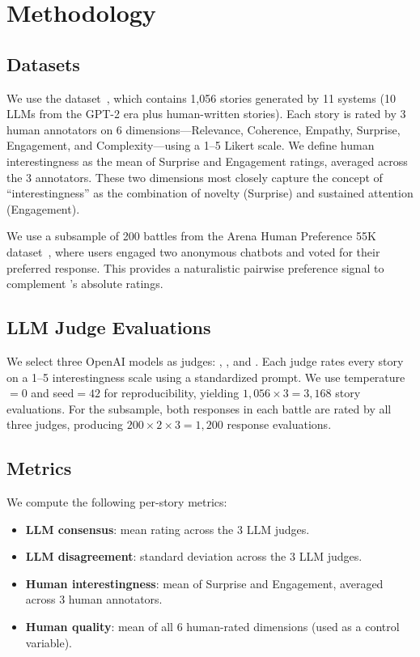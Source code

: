 \section{Methodology}
\label{sec:method}

\subsection{Datasets}
\label{sec:datasets}

We use the \hanna dataset~\citep{chhun2022hanna}, which contains 1,056 stories generated by 11 systems (10 LLMs from the GPT-2 era plus human-written stories).
Each story is rated by 3 human annotators on 6 dimensions---Relevance, Coherence, Empathy, Surprise, Engagement, and Complexity---using a 1--5 Likert scale.
We define human interestingness as the mean of Surprise and Engagement ratings, averaged across the 3 annotators.
These two dimensions most closely capture the concept of ``interestingness'' as the combination of novelty (Surprise) and sustained attention (Engagement).

We use a subsample of 200 battles from the Arena Human Preference 55K dataset~\citep{lmsys2023arena}, where users engaged two anonymous chatbots and voted for their preferred response.
This provides a naturalistic pairwise preference signal to complement \hanna's absolute ratings.

\subsection{LLM Judge Evaluations}
\label{sec:judges}

We select three OpenAI models as judges: \gptfo, \gptfomini, and \gptfourmini.
Each judge rates every \hanna story on a 1--5 interestingness scale using a standardized prompt.
We use temperature${}=0$ and seed${}=42$ for reproducibility, yielding $1{,}056 \times 3 = 3{,}168$ story evaluations.
For the \arena subsample, both responses in each battle are rated by all three judges, producing $200 \times 2 \times 3 = 1{,}200$ response evaluations.

\subsection{Metrics}
\label{sec:metrics}

We compute the following per-story metrics:
\begin{itemize}[leftmargin=*,itemsep=0pt,topsep=0pt]
    \item \textbf{LLM consensus}: mean rating across the 3 LLM judges.
    \item \textbf{LLM disagreement}: standard deviation across the 3 LLM judges.
    \item \textbf{Human interestingness}: mean of Surprise and Engagement, averaged across 3 human annotators.
    \item \textbf{Human quality}: mean of all 6 human-rated dimensions (used as a control variable).
\end{itemize}

